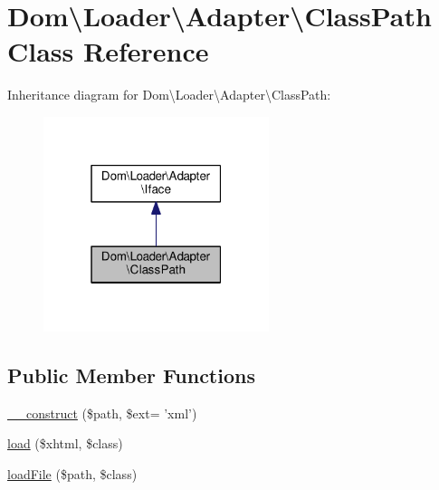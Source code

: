 \hypertarget{classDom_1_1Loader_1_1Adapter_1_1ClassPath}{\section{Dom\textbackslash{}Loader\textbackslash{}Adapter\textbackslash{}Class\+Path Class Reference}
\label{classDom_1_1Loader_1_1Adapter_1_1ClassPath}
}


Inheritance diagram for Dom\textbackslash{}Loader\textbackslash{}Adapter\textbackslash{}Class\+Path\+:\nopagebreak
\begin{figure}[H]
\begin{center}
\leavevmode
\includegraphics[width=187pt]{classDom_1_1Loader_1_1Adapter_1_1ClassPath__inherit__graph}
\end{center}
\end{figure}
\subsection*{Public Member Functions}
\begin{DoxyCompactItemize}
\item 
\hyperlink{classDom_1_1Loader_1_1Adapter_1_1ClassPath_a2318a0e91b0fdb17ed11607422606488}{\+\_\+\+\_\+construct} (\$path, \$ext= 'xml')
\item 
\hyperlink{classDom_1_1Loader_1_1Adapter_1_1ClassPath_a3a166e4fefe892ff9caee266167fbb0b}{load} (\$xhtml, \$class)
\item 
\hyperlink{classDom_1_1Loader_1_1Adapter_1_1ClassPath_a16057826d74de740beb56b4d73dc0b79}{load\+File} (\$path, \$class)
\end{DoxyCompactItemize}
